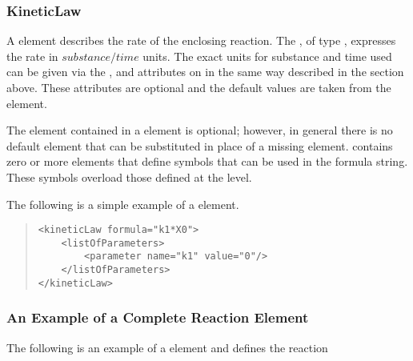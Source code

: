 \documentclass[10pt]{cek-article}
\begin{document}
\subsubsection{KineticLaw}

A  element describes the rate of the enclosing reaction.
The , of type , expresses the rate in
$substance/time$ units. The exact units for substance and time used can be
given via the ,  and
 attributes on  in
the same way described in the  section above.  These
attributes are optional and the default values are taken from the
 element.

The  element contained in a  element is
optional; however, in general there is no default element that can be
substituted in place of a missing  element.
 contains zero or more  elements that
define symbols that can be used in the formula string.  These symbols
overload those defined at the  level.

The following is a simple example of a  element.
\begin{quote}
  \begin{small}
    \tightspacing
\begin{verbatim}
<kineticLaw formula="k1*X0">
    <listOfParameters>
        <parameter name="k1" value="0"/>
    </listOfParameters>
</kineticLaw>
\end{verbatim}
    \regularspacing
  \end{small}
\end{quote}

\subsubsection{An Example of a Complete Reaction Element}

The following is an example of a  element and
defines the reaction
\end{document}

